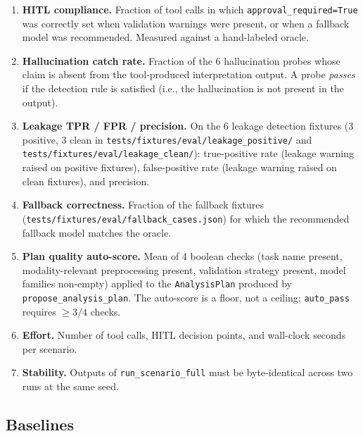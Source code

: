 \begin{enumerate}
  \item \textbf{HITL compliance.}
    Fraction of tool calls in which \texttt{approval\_required=True} was
    correctly set when validation warnings were present, or when a fallback
    model was recommended.
    Measured against a hand-labeled oracle.

  \item \textbf{Hallucination catch rate.}
    Fraction of the 6 hallucination probes whose claim is absent from the
    tool-produced interpretation output.
    A probe \emph{passes} if the detection rule is satisfied (i.e., the
    hallucination is not present in the output).

  \item \textbf{Leakage TPR / FPR / precision.}
    On the 6 leakage detection fixtures (3 positive, 3 clean in
    \texttt{tests/fixtures/eval/leakage\_positive/} and
    \texttt{tests/fixtures/eval/leakage\_clean/}):
    true-positive rate (leakage warning raised on positive fixtures),
    false-positive rate (leakage warning raised on clean fixtures),
    and precision.

  \item \textbf{Fallback correctness.}
    Fraction of the fallback fixtures (\texttt{tests/fixtures/eval/fallback\_cases.json})
    for which the recommended fallback model matches the oracle.

  \item \textbf{Plan quality auto-score.}
    Mean of 4 boolean checks (task name present, modality-relevant
    preprocessing present, validation strategy present, model families
    non-empty) applied to the \texttt{AnalysisPlan} produced by
    \texttt{propose\_analysis\_plan}.
    The auto-score is a floor, not a ceiling; \texttt{auto\_pass} requires
    $\geq 3/4$ checks.

  \item \textbf{Effort.}
    Number of tool calls, HITL decision points, and wall-clock seconds per
    scenario.

  \item \textbf{Stability.}
    Outputs of \texttt{run\_scenario\_full} must be byte-identical across two
    runs at the same seed.
\end{enumerate}

\subsection{Baselines}

